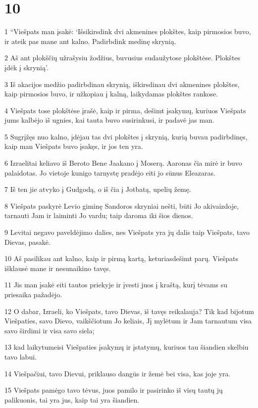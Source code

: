 \chapter{10}

\par 1 “Viešpats man įsakė: ‘Išsikirsdink dvi akmenines plokštes, kaip pirmosios buvo, ir ateik pas mane ant kalno. Padirbdink medinę skrynią. 
\par 2 Aš ant plokščių užrašysiu žodžius, buvusius sudaužytose plokštėse. Plokštes įdėk į skrynią’. 
\par 3 Iš akacijos medžio padirbdinau skrynią, iškirsdinau dvi akmenines plokštes, kaip pirmosios buvo, ir užkopiau į kalną, laikydamas plokštes rankose. 
\par 4 Viešpats tose plokštėse įrašė, kaip ir pirma, dešimt įsakymų, kuriuos Viešpats jums kalbėjo iš ugnies, kai tauta buvo susirinkusi, ir padavė jas man. 
\par 5 Sugrįžęs nuo kalno, įdėjau tas dvi plokštes į skrynią, kurią buvau padirbdinęs, kaip man Viešpats buvo įsakęs, ir jos ten yra. 
\par 6 Izraelitai keliavo iš Beroto Bene Jaakano į Moserą. Aaronas čia mirė ir buvo palaidotas. Jo vietoje kunigo tarnystę pradėjo eiti jo sūnus Eleazaras. 
\par 7 Iš ten jie atvyko į Gudgodą, o iš čia­ į Jotbatą, upelių žemę. 
\par 8 Viešpats paskyrė Levio giminę Sandoros skryniai nešti, būti Jo akivaizdoje, tarnauti Jam ir laiminti Jo vardu; taip daroma iki šios dienos. 
\par 9 Levitai negavo paveldėjimo dalies, nes Viešpats yra jų dalis­ taip Viešpats, tavo Dievas, pasakė. 
\par 10 Aš pasilikau ant kalno, kaip ir pirmą kartą, keturiasdešimt parų. Viešpats išklausė mane ir nesunaikino tavęs. 
\par 11 Jis man įsakė eiti tautos priekyje ir įvesti juos į kraštą, kurį tėvams su priesaika pažadėjo. 
\par 12 O dabar, Izraeli, ko Viešpats, tavo Dievas, iš tavęs reikalauja? Tik kad bijotum Viešpaties, savo Dievo, vaikščiotum Jo keliais, Jį mylėtum ir Jam tarnautum visa savo širdimi ir visa savo siela; 
\par 13 kad laikytumeisi Viešpaties įsakymų ir įstatymų, kuriuos tau šiandien skelbiu tavo labui. 
\par 14 Viešpačiui, tavo Dievui, priklauso dangūs ir žemė bei visa, kas joje yra. 
\par 15 Viešpats pamėgo tavo tėvus, juos pamilo ir pasirinko iš visų tautų jų palikuonis, tai yra jus, kaip tai yra šiandien. 
